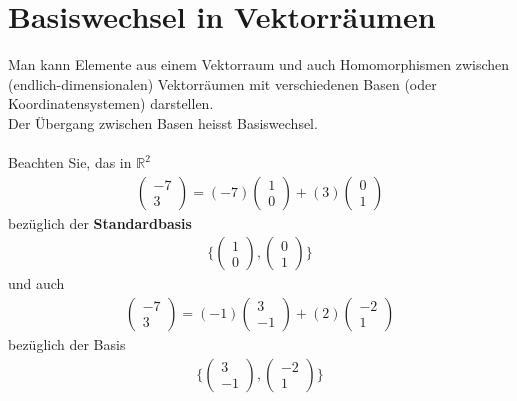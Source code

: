 \documentclass[11pt]{report}
\newcommand*\Zb[1] {\mathbb{#1}}
\newcommand*\f[1] {\textbf{#1}}
\begin{document}
\section{Basiswechsel in Vektorräumen}
Man kann Elemente aus einem Vektorraum und auch Homomorphismen zwischen (endlich-dimensionalen) Vektorräumen mit verschiedenen Basen (oder Koordinatensystemen) darstellen.\\
Der Übergang zwischen Basen heisst Basiswechsel.\\\\
Beachten Sie, das in $\Zb{R}^2$
\begin{align}
\begin{pmatrix} -7 \\ 3\end{pmatrix} = (-7) \begin{pmatrix} 1 \\ 0\end{pmatrix} + (3) \begin{pmatrix} 0 \\ 1 \end{pmatrix}
\end{align}
bezüglich der \f{Standardbasis}
\begin{align}
\{\begin{pmatrix} 1 \\ 0\end{pmatrix},\begin{pmatrix} 0 \\ 1 \end{pmatrix}\}
\end{align}
und auch
\begin{align}
\begin{pmatrix} -7 \\ 3\end{pmatrix} = (-1) \begin{pmatrix} 3 \\ -1\end{pmatrix} + (2) \begin{pmatrix} -2 \\ 1 \end{pmatrix}
\end{align}
bezüglich der Basis
\begin{align}
\{\begin{pmatrix} 3 \\ -1\end{pmatrix},\begin{pmatrix} -2 \\ 1 \end{pmatrix}\}
\end{align}
\end{document}
